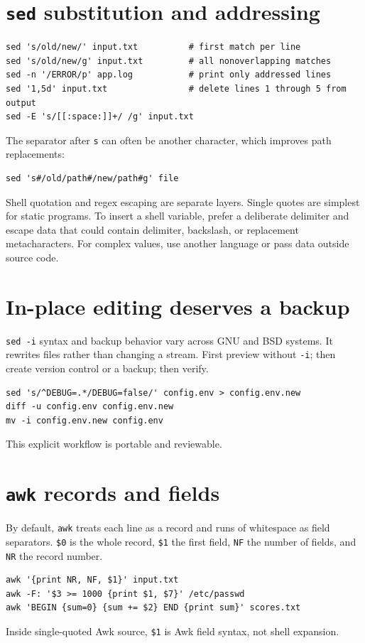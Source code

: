 \documentclass[11pt,oneside,openany]{book}
\begin{document}
\section{\texttt{sed} substitution and addressing}
\begin{lstlisting}
sed 's/old/new/' input.txt          # first match per line
sed 's/old/new/g' input.txt         # all nonoverlapping matches
sed -n '/ERROR/p' app.log           # print only addressed lines
sed '1,5d' input.txt                # delete lines 1 through 5 from output
sed -E 's/[[:space:]]+/ /g' input.txt
\end{lstlisting}
The separator after \texttt{s} can often be another character, which improves path replacements:
\begin{lstlisting}
sed 's#/old/path#/new/path#g' file
\end{lstlisting}
Shell quotation and regex escaping are separate layers. Single quotes are simplest for static programs. To insert a shell variable, prefer a deliberate delimiter and escape data that could contain delimiter, backslash, or replacement metacharacters. For complex values, use another language or pass data outside source code.

\section{In-place editing deserves a backup}
\texttt{sed -i} syntax and backup behavior vary across GNU and BSD systems. It rewrites files rather than changing a stream. First preview without \texttt{-i}; then create version control or a backup; then verify.
\begin{lstlisting}
sed 's/^DEBUG=.*/DEBUG=false/' config.env > config.env.new
diff -u config.env config.env.new
mv -i config.env.new config.env
\end{lstlisting}
This explicit workflow is portable and reviewable.

\section{\texttt{awk} records and fields}
By default, \texttt{awk} treats each line as a record and runs of whitespace as field separators. \texttt{\$0} is the whole record, \texttt{\$1} the first field, \texttt{NF} the number of fields, and \texttt{NR} the record number.
\begin{lstlisting}
awk '{print NR, NF, $1}' input.txt
awk -F: '$3 >= 1000 {print $1, $7}' /etc/passwd
awk 'BEGIN {sum=0} {sum += $2} END {print sum}' scores.txt
\end{lstlisting}
Inside single-quoted Awk source, \texttt{\$1} is Awk field syntax, not shell expansion.
\end{document}
